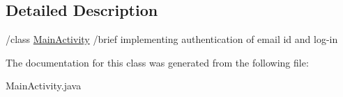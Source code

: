 \subsection{Detailed Description}
/class \hyperlink{classcom_1_1example_1_1sel_1_1lostfound_1_1MainActivity}{Main\+Activity} /brief implementing authentication of email id and log-\/in 

The documentation for this class was generated from the following file\+:\begin{DoxyCompactItemize}
\item 
Main\+Activity.\+java\end{DoxyCompactItemize}
